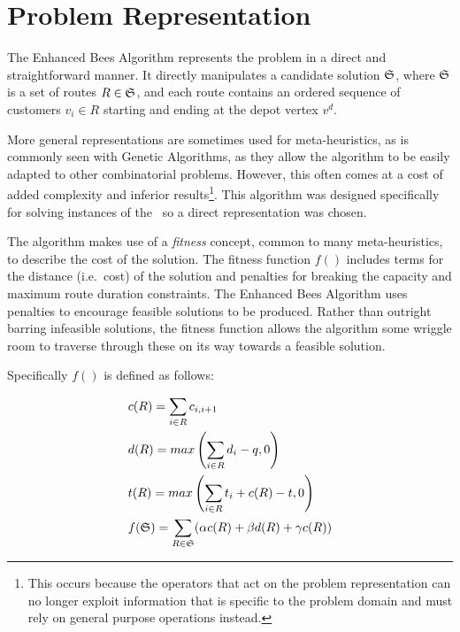 \section{Problem Representation}
\label{sec:problemrepresentation}

The Enhanced Bees Algorithm represents the problem in a direct and straightforward manner. It directly manipulates a candidate solution $\mathfrak{S}$, where $\mathfrak{S}$ is a set of routes $R \in \mathfrak{S}$, and each route contains an ordered sequence of customers $v_i \in R$ starting and ending at the depot vertex $v^d$.


More general representations are sometimes used for meta-heuristics, as is commonly seen with Genetic Algorithms, as they allow the algorithm to be easily adapted to other combinatorial problems. However, this often comes at a cost of added complexity and inferior results\footnote{This occurs because the operators that act on the problem representation can no longer exploit information that is specific to the problem domain and must rely on general purpose operations instead.}. This algorithm was designed specifically for solving instances of the \VRP\ so a direct representation was chosen.

The algorithm makes use of a \emph{fitness} concept, common to many meta-heuristics, to describe the cost of the solution. The fitness function $f()$ includes terms for the distance (i.e.~cost) of the solution and penalties for breaking the capacity and maximum route duration constraints. The Enhanced Bees Algorithm uses penalties to encourage feasible solutions to be produced. Rather than outright barring infeasible solutions, the fitness function allows the algorithm some wriggle room to traverse through these on its way towards a feasible solution.

Specifically $f()$ is defined as follows:

\begin{align}
   & c(R) = \sum_{i \in R} c_{i, i+1} \\
   & d(R) = max\left( \sum_{i \in R} d_i - q, 0 \right)  \\
   & t(R) = max\left( \sum_{i \in R} t_i + c(R) - t, 0 \right)  \\
   & f(\mathfrak{S}) = \sum_{R \in \mathfrak{S}} (\alpha c(R) + \beta d(R) + \gamma c(R))
\end{align}

